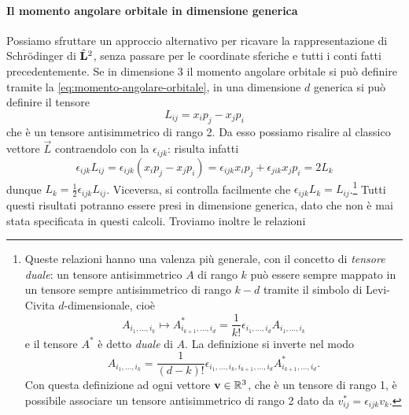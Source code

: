 \paragraph{Il momento angolare orbitale in dimensione generica}
Possiamo sfruttare un approccio alternativo per ricavare la rappresentazione di Schr\"odinger di $\hat{\mathbf{L}}^2$, senza passare per le coordinate sferiche e tutti i conti fatti precedentemente.
Se in dimensione 3 il momento angolare orbitale si può definire tramite la \eqref{eq:momento-angolare-orbitale}, in una dimensione $d$ generica si può definire il tensore
\begin{equation}
	L_{ij}=x_ip_j-x_jp_i
	\label{eq:tensore-momento-angolare}
\end{equation}
che è un tensore antisimmetrico di rango 2.
Da esso possiamo risalire al classico vettore $\vec L$ contraendolo con la $\epsilon_{ijk}$: risulta infatti
\begin{equation}
	\epsilon_{ijk}L_{ij}=\epsilon_{ijk}(x_ip_j-x_jp_i)=\epsilon_{ijk}x_ip_j+\epsilon_{jik}x_jp_i=2L_k
\end{equation}
dunque $L_k=\frac12\epsilon_{ijk}L_{ij}$.
Viceversa, si controlla facilmente che $\epsilon_{ijk}L_k=L_{ij}$.\footnote{
	Queste relazioni hanno una valenza più generale, con il concetto di \emph{tensore duale}: un tensore antisimmetrico $A$ di rango $k$ può essere sempre mappato in un tensore sempre antisimmetrico di rango $k-d$ tramite il simbolo di Levi-Civita $d$-dimensionale, cioè
	\begin{equation}
		A_{i_1,\dots,i_k}\mapsto A^*_{i_{k+1},\dots,i_d}=\frac1{k!}\epsilon_{i_1,\dots,i_d}A_{i_1,\dots,i_k}
		\label{eq:tensore-duale}
	\end{equation}
	e il tensore $A^*$ è detto \emph{duale} di $A$.
	La definizione si inverte nel modo
	\begin{equation}
		A_{i_1,\dots,i_k}=\frac1{(d-k)!}\epsilon_{i_1,\dots,i_k,i_{k+1},\dots,i_d}A^*_{i_{k+1},\dots,i_d}.
		\label{eq:tensore-duale-inversione}
	\end{equation}
	Con questa definizione ad ogni vettore $\mathbf{v}\in\mathbb{R}^3$, che è un tensore di rango 1, è possibile associare un tensore antisimmetrico di rango 2 dato da $v^*_{ij}=\epsilon_{ijk}v_k$.
}
Tutti questi risultati potranno essere presi in dimensione generica, dato che non è mai stata specificata in questi calcoli.
Troviamo inoltre le relazioni
